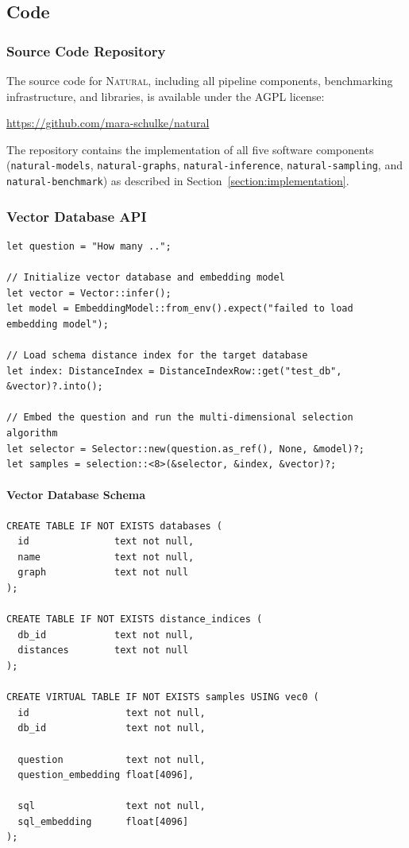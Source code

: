 \subsection{Code}

\subsubsection{Source Code Repository}\label{appendix:source-code}

The source code for \textsc{Natural}, including all pipeline components,
benchmarking infrastructure, and libraries, is available under the AGPL
license:

\begin{center}
\url{https://github.com/mara-schulke/natural}
\end{center}

The repository contains the implementation of all five software components
(\texttt{natural-models}, \texttt{natural-graphs}, \texttt{natural-inference},
\texttt{natural-sampling}, and \texttt{natural-benchmark}) as described in
Section~\ref{section:implementation}.

\subsubsection{Vector Database API}\label{appendix:vector-db-api}

\begin{verbatim}
let question = "How many ..";

// Initialize vector database and embedding model
let vector = Vector::infer();
let model = EmbeddingModel::from_env().expect("failed to load embedding model");

// Load schema distance index for the target database
let index: DistanceIndex = DistanceIndexRow::get("test_db", &vector)?.into();

// Embed the question and run the multi-dimensional selection algorithm
let selector = Selector::new(question.as_ref(), None, &model)?;
let samples = selection::<8>(&selector, &index, &vector)?;
\end{verbatim}

\paragraph{Vector Database Schema}\label{appendix:vector-schema}

\begin{verbatim}
CREATE TABLE IF NOT EXISTS databases (
  id               text not null,
  name             text not null,
  graph            text not null
);

CREATE TABLE IF NOT EXISTS distance_indices (
  db_id            text not null,
  distances        text not null
);

CREATE VIRTUAL TABLE IF NOT EXISTS samples USING vec0 (
  id                 text not null,
  db_id              text not null,

  question           text not null,
  question_embedding float[4096],

  sql                text not null,
  sql_embedding      float[4096]
);
\end{verbatim}

